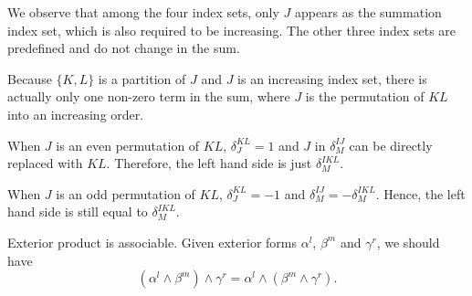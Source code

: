 \documentclass[11pt, a4paper]{book}
\begin{document}
\begin{Proof}
  We observe that among the four index sets, only $J$ appears as the summation index set,
  which is also required to be increasing. The other three index sets are predefined and
  do not change in the sum.

  Because $\{K,L\}$ is a partition of $J$ and $J$ is an increasing index set, there is
  actually only one non-zero term in the sum, where $J$ is the permutation of $KL$ into an
  increasing order.

  When $J$ is an even permutation of $KL$, $\delta_J^{KL} = 1$ and $J$ in $\delta_M^{IJ}$
  can be directly replaced with $KL$. Therefore, the left hand side is just $\delta_M^{IKL}$.

  When $J$ is an odd permutation of $KL$, $\delta_J^{KL} = -1$ and
  $\delta_M^{IJ} = -\delta_M^{IKL}$. Hence, the left hand side is still equal to
  $\delta_M^{IKL}$.
\end{Proof}

\begin{Proposition}
  Exterior product is associable. Given exterior forms $\alpha^l$, $\beta^m$ and
  $\gamma^r$, we should have
  \begin{equation}
    \left( \alpha^l\wedge\beta^m \right)\wedge\gamma^r = \alpha^l\wedge \left(
      \beta^m\wedge\gamma^r \right).
  \end{equation}
\end{Proposition}
\end{document}
